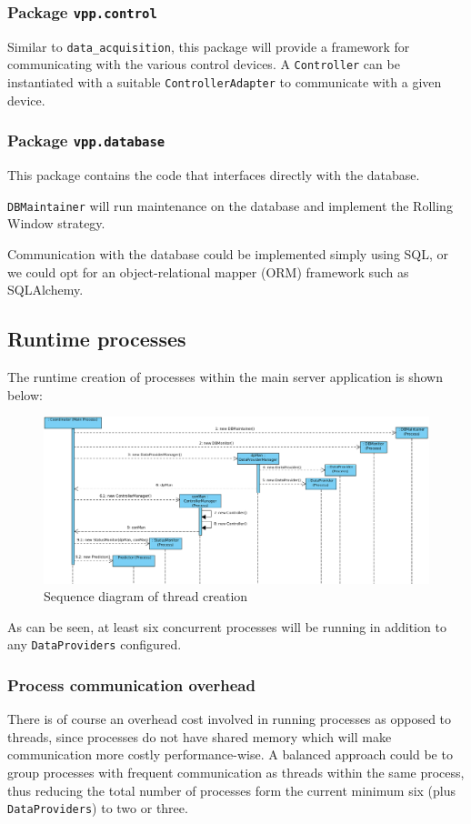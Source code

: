 \subsubsection{Package \texttt{vpp.control}}
Similar to \texttt{data\_acquisition}, this package will provide a framework for communicating with the various control devices. A \texttt{Controller} can be instantiated with a suitable \texttt{ControllerAdapter} to communicate with a given device. 


\subsubsection{Package \texttt{vpp.database}}
This package contains the code that interfaces directly with the database. 

\texttt{DBMaintainer} will run maintenance on the database and implement the Rolling Window strategy.

Communication with the database could be implemented simply using SQL, or we could opt for an object-relational mapper (ORM) framework such as SQLAlchemy.


\subsection{Runtime processes}

The runtime creation of processes within the main server application is shown below:
\begin{figure}[H]
    \centering
    \includegraphics[width=\textwidth]{figures/seq_diagram}
    \caption{Sequence diagram of thread creation}
    \label{figureSeqDiagram}
\end{figure}
As can be seen, at least six concurrent processes will be running in addition to any \texttt{DataProviders} configured.


\subsubsection{Process communication overhead}
There is of course an overhead cost involved in running processes as opposed to threads, since processes do not have shared memory which will make communication more costly performance-wise. A balanced approach could be to group processes with frequent communication as threads within the same process, thus reducing the total number of processes form the current minimum six (plus \texttt{DataProviders}) to two or three. 

